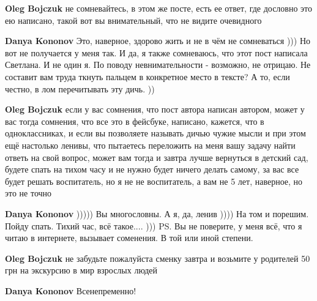 \begin{itemize}
\begin{itemize}
\textbf{Oleg Bojczuk} не сомневайтесь, в этом же посте, есть ее ответ, где дословно это ею написано, такой вот вы внимательный, что не видите очевидного

 
\textbf{Danya Kononov} Это, наверное, здорово жить и не в чём не сомневаться ))) Но вот не получается у меня так. И да, я также сомневаюсь, что этот пост написала Светлана. И не один я. По поводу невнимательности - возможно, не отрицаю. Не составит вам труда ткнуть пальцем в конкретное место в тексте? А то, если честно, в лом перечитывать эту дичь. ))

 
\textbf{Oleg Bojczuk} если у вас сомнения, что пост автора написан автором, может у вас тогда сомнения, что все это в фейсбуке, написано, кажется, что в одноклассниках, и если вы позволяете называть дичью чужие мысли и при этом ещё настолько ленивы, что пытаетесь переложить на меня вашу задачу найти ответь на свой вопрос, может вам тогда и завтра лучше вернуться в детский сад, будете спать на тихом часу и не нужно будет ничего делать самому, за вас все будет решать воспитатель, но я не не воспитатель, а вам не 5 лет, наверное, но это не точно

 
\textbf{Danya Kononov} ))))) Вы многословны. А я, да, ленив )))) На том и порешим. Пойду спать. Тихий час, всё такое.... )))
PS. Вы не поверите, у меня всё, что я читаю в интернете, вызывает соменения. В той или иной степени.

 
\textbf{Oleg Bojczuk} не забудьте пожалуйста сменку завтра и возьмите у родителей 50 грн на экскурсию в мир взрослых людей

 
\textbf{Danya Kononov} Всенепременно! \Smiley[1.0][yellow]

\end{itemize}



\end{itemize}

